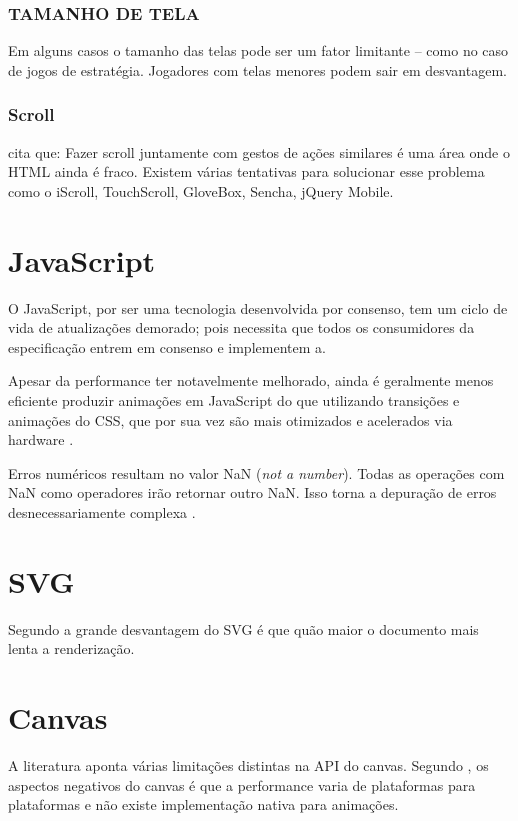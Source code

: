 \begin{draft}
\subsubsection{TAMANHO DE TELA}
Em alguns casos o tamanho das telas pode ser um fator limitante – como
no caso de jogos de estratégia. Jogadores com telas menores podem sair
em desvantagem.

\subsubsection{Scroll}
\autocite[pp. 9]{aSeriousContender} cita que:
Fazer scroll juntamente com gestos de ações similares é uma área
onde o HTML ainda é fraco. Existem várias tentativas para solucionar
esse problema como o iScroll, TouchScroll, GloveBox, Sencha, jQuery
Mobile.

\section{JavaScript}

O JavaScript, por ser uma tecnologia desenvolvida por consenso, tem um
ciclo de vida de atualizações demorado; pois necessita que todos os
consumidores da especificação entrem em consenso e implementem a.

Apesar da performance ter notavelmente melhorado, ainda é geralmente
menos eficiente produzir animações em JavaScript do que utilizando
transições e animações do CSS, que por sua vez são mais otimizados
e acelerados via hardware \autocite{html5mostwanted}.

Erros numéricos resultam no valor NaN (\textit{not a number}).
Todas as operações com NaN como operadores irão retornar outro
NaN. Isso torna a depuração de erros desnecessariamente complexa
\autocite{html5mostwanted}.


\section{SVG}

Segundo \cite{html5mostwanted} a grande desvantagem do SVG é que quão
maior o documento mais lenta a renderização.

\section{Canvas}

A literatura aponta várias limitações distintas na API do canvas.
Segundo \autocite{html5mostwanted}, os aspectos negativos do canvas é
que a performance varia de plataformas para plataformas e não existe
implementação nativa para animações.


\end{draft}
